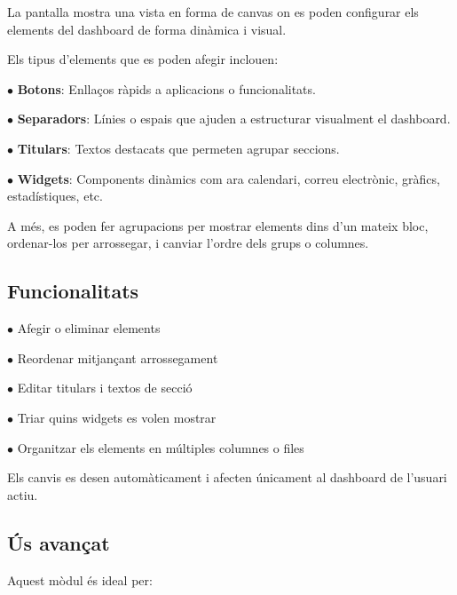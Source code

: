 \documentclass[a4paper]{article}
\begin{document}
La pantalla mostra una vista en forma de canvas on es poden configurar els elements del dashboard de forma dinàmica i visual.

Els tipus d’elements que es poden afegir inclouen:

\begin{compactitem}
\item[\color{myblue}$\bullet$] \textbf{Botons}: Enllaços ràpids a aplicacions o funcionalitats.
\item[\color{myblue}$\bullet$] \textbf{Separadors}: Línies o espais que ajuden a estructurar visualment el dashboard.
\item[\color{myblue}$\bullet$] \textbf{Titulars}: Textos destacats que permeten agrupar seccions.
\item[\color{myblue}$\bullet$] \textbf{Widgets}: Components dinàmics com ara calendari, correu electrònic, gràfics, estadístiques, etc.
\end{compactitem}

A més, es poden fer agrupacions per mostrar elements dins d’un mateix bloc, ordenar-los per arrossegar, i canviar l’ordre dels grups o columnes.

\hypertarget{toc88}{}
\subsection{Funcionalitats}

\begin{compactitem}
\item[\color{myblue}$\bullet$] Afegir o eliminar elements
\item[\color{myblue}$\bullet$] Reordenar mitjançant arrossegament
\item[\color{myblue}$\bullet$] Editar titulars i textos de secció
\item[\color{myblue}$\bullet$] Triar quins widgets es volen mostrar
\item[\color{myblue}$\bullet$] Organitzar els elements en múltiples columnes o files
\end{compactitem}

Els canvis es desen automàticament i afecten únicament al dashboard de l’usuari actiu.

\hypertarget{toc89}{}
\subsection{Ús avançat}

Aquest mòdul és ideal per:
\end{document}
